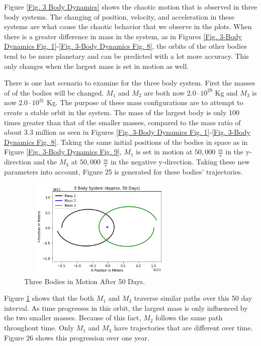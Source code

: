 \documentclass[twocolumn]{article}
\begin{document}
\par \noindent
Figure \ref{Fig. 3 Body Dynamics} shows the chaotic motion that is observed in three body systems. The changing of position, velocity, and acceleration in these systems are what cause the chaotic behavior that we observe in the plots. When there is a greater difference in mass in the system, as in Figures \ref{Fig. 3-Body Dynamics Fig. 1}-\ref{Fig. 3-Body Dynamics Fig. 8}, the orbits of the other bodies tend to be more planetary and can be predicted with a lot more accuracy. This only changes when the largest mass is set in motion as well. 

There is one last scenario to examine for the three body system. First the masses of of the bodies will be changed. $M_1$ and $M_2$ are both now $2.0\cdot10^{29}$ Kg and $M_3$ is now $2.0\cdot10^{31}$ Kg. The purpose of these mass configurations are to attempt to create a stable orbit in the system. The mass of the largest body is only 100 times greater than that of the smaller masses, compared to the mass ratio of about 3.3 million as seen in Figures \ref{Fig. 3-Body Dynamics Fig. 1}-\ref{Fig. 3-Body Dynamics Fig. 8}. Taking the same initial positions of the bodies in space as in Figure \ref{Fig. 3-Body Dynamics Fig. 9}, $M_1$ is set in motion at $50,000$ $\frac{m}{s}$ in the y-direction and the $M_3$ at $50,000$ $\frac{m}{s}$ in the negative y-direction. Taking these new parameters into account, Figure 25 is generated for these bodies' trajectories.
\newpage
\begin{figure}[ht]
    \centering
    \includegraphics[width=8cm, height=4.75cm]{Figures/3-Body Dynamics (12).png}
    \caption{\small{Three Bodies in Motion After 50 Days.}}
    \label{Fig. 3-Body Dynamics Fig. 12}
\end{figure}
\par \noindent
Figure \ref{Fig. 3-Body Dynamics Fig. 12} shows that the both $M_1$ and $M_3$ traverse similar paths over this 50 day interval. As time progresses in this orbit, the largest mass is only influenced by the two smaller masses. Because of this fact, $M_2$ follows the same path throughout time. Only $M_1$ and $M_3$ have trajectories that are different over time. Figure 26 shows this progression over one year.
\end{document}
